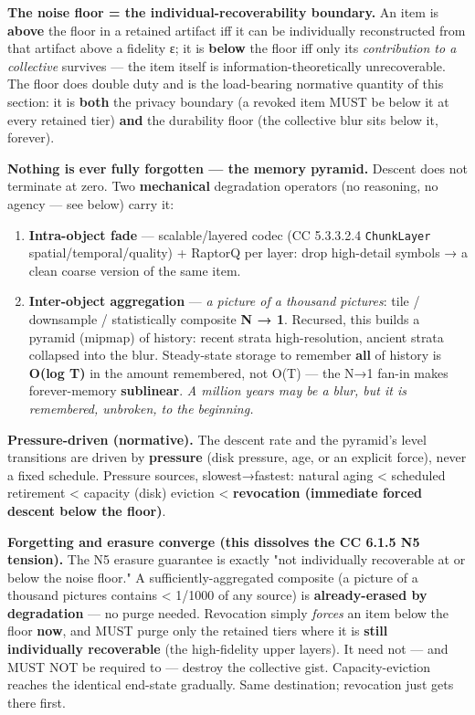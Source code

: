 \documentclass[11pt]{article}
\begin{document}
\textbf{The noise floor = the individual-recoverability boundary.} An item is \textbf{above} the floor in a retained artifact iff it can be individually reconstructed from that artifact above a fidelity ε; it is \textbf{below} the floor iff only its \textit{contribution to a collective} survives — the item itself is information-theoretically unrecoverable. The floor does double duty and is the load-bearing normative quantity of this section: it is \textbf{both} the privacy boundary (a revoked item MUST be below it at every retained tier) \textbf{and} the durability floor (the collective blur sits below it, forever).


\textbf{Nothing is ever fully forgotten — the memory pyramid.} Descent does not terminate at zero. Two \textbf{mechanical} degradation operators (no reasoning, no agency — see below) carry it:

\begin{enumerate}\setlength\itemsep{0pt}
\item \textbf{Intra-object fade} — scalable/layered codec (CC 5.3.3.2.4 \texttt{ChunkLayer} spatial/temporal/quality) + RaptorQ per layer: drop high-detail symbols → a clean coarse version of the same item.
\item \textbf{Inter-object aggregation} — \textit{a picture of a thousand pictures}: tile / downsample / statistically composite \textbf{N → 1}. Recursed, this builds a pyramid (mipmap) of history: recent strata high-resolution, ancient strata collapsed into the blur. Steady-state storage to remember \textbf{all} of history is \textbf{O(log T)} in the amount remembered, not O(T) — the N→1 fan-in makes forever-memory \textbf{sublinear}. \textit{A million years may be a blur, but it is remembered, unbroken, to the beginning.}
\end{enumerate}


\textbf{Pressure-driven (normative).} The descent rate and the pyramid's level transitions are driven by \textbf{pressure} (disk pressure, age, or an explicit force), never a fixed schedule. Pressure sources, slowest→fastest: natural aging < scheduled retirement < capacity (disk) eviction < \textbf{revocation (immediate forced descent below the floor)}.


\textbf{Forgetting and erasure converge (this dissolves the CC 6.1.5 N5 tension).} The N5 erasure guarantee is exactly "not individually recoverable at or below the noise floor." A sufficiently-aggregated composite (a picture of a thousand pictures contains < 1/1000 of any source) is \textbf{already-erased by degradation} — no purge needed. Revocation simply \textit{forces} an item below the floor \textbf{now}, and MUST purge only the retained tiers where it is \textbf{still individually recoverable} (the high-fidelity upper layers). It need not — and MUST NOT be required to — destroy the collective gist. Capacity-eviction reaches the identical end-state gradually. Same destination; revocation just gets there first.
\end{document}
